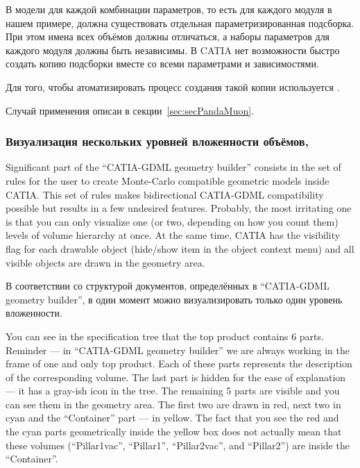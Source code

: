 В модели для каждой комбинации параметров, то есть для каждого модуля в нашем примере, должна существовать отдельная параметризированная подсборка. При этом имена всех объёмов должны отличаться, а наборы параметров для каждого модуля должны быть независимы. В CATIA нет возможности быстро создать копию подсборки вместе со всеми параметрами и зависимостями.

Для того, чтобы атоматизировать процесс создания такой копии используется .

Случай применения  описан в секции~\ref{sec:secPandaMuon}.

\subsubsection{Визуализация нескольких уровней вложенности объёмов, }\label{sec:MultiLevelVis}


Significant part of the ``CATIA-GDML geometry builder'' consists in the set of rules for the user to create Monte-Carlo compatible geometric models inside CATIA.  This set of rules makes bidirectional CATIA-GDML compatibility possible but results in a few undesired features. Probably, the most irritating one is that you can only visualize one (or two, depending on how you count them) levels of volume hierarchy at once. At the same time, CATIA has the visibility flag for each drawable object (hide/show item in the object context menu) and all visible objects are drawn in the geometry area.

В соответствии со структурой документов, определённых в ``CATIA-GDML geometry builder'', в один момент можно визуализировать только один уровень вложенности.

You can see in the specification tree that the top product contains 6 parts. Reminder --- in ``CATIA-GDML geometry builder'' we are always working in the frame of one and only top product. Each of these parts represents the description of the corresponding volume. The last part is hidden for the ease of explanation --- it has a gray-ish icon in the tree. The remaining 5 parts are visible and you can see them in the geometry area. The first two are drawn in red, next two in cyan and the ``Container'' part --- in yellow. The fact that you see the red and the cyan parts geometrically inside the yellow box does not actually mean that these volumes (``Pillar1\textunderscore vac'', ``Pillar1'', ``Pillar2\textunderscore vac'', and ``Pillar2'') are inside the ``Container''.

